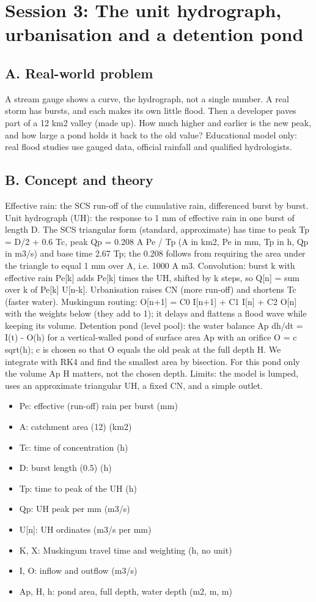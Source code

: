\documentclass[11pt,a4paper]{article}
\begin{document}
\section{Session 3: The unit hydrograph, urbanisation and a detention pond}

\subsection*{A. Real-world problem}
A stream gauge shows a curve, the hydrograph, not a single number. A real storm has bursts, and each makes its own little flood. Then a developer paves part of a 12 km2 valley (made up). How much higher and earlier is the new peak, and how large a pond holds it back to the old value? Educational model only: real flood studies use gauged data, official rainfall and qualified hydrologists.

\subsection*{B. Concept and theory}
Effective rain: the SCS run-off of the cumulative rain, differenced burst by burst. Unit hydrograph (UH): the response to 1 mm of effective rain in one burst of length D. The SCS triangular form (standard, approximate) has time to peak Tp = D/2 + 0.6 Tc, peak Qp = 0.208 A Pe / Tp (A in km2, Pe in mm, Tp in h, Qp in m3/s) and base time 2.67 Tp; the 0.208 follows from requiring the area under the triangle to equal 1 mm over A, i.e. 1000 A m3. Convolution: burst k with effective rain Pe[k] adds Pe[k] times the UH, shifted by k steps, so Q[n] = sum over k of Pe[k] U[n-k]. Urbanisation raises CN (more run-off) and shortens Tc (faster water). Muskingum routing: O[n+1] = C0 I[n+1] + C1 I[n] + C2 O[n] with the weights below (they add to 1); it delays and flattens a flood wave while keeping its volume. Detention pond (level pool): the water balance Ap dh/dt = I(t) - O(h) for a vertical-walled pond of surface area Ap with an orifice O = c sqrt(h); c is chosen so that O equals the old peak at the full depth H. We integrate with RK4 and find the smallest area by bisection. For this pond only the volume Ap H matters, not the chosen depth. Limits: the model is lumped, uses an approximate triangular UH, a fixed CN, and a simple outlet.

\begin{itemize}[nosep]
\item Pe: effective (run-off) rain per burst (mm)
\item A: catchment area (12) (km2)
\item Tc: time of concentration (h)
\item D: burst length (0.5) (h)
\item Tp: time to peak of the UH (h)
\item Qp: UH peak per mm (m3/s)
\item U[n]: UH ordinates (m3/s per mm)
\item K, X: Muskingum travel time and weighting (h, no unit)
\item I, O: inflow and outflow (m3/s)
\item Ap, H, h: pond area, full depth, water depth (m2, m, m)
\end{itemize}
\end{document}
